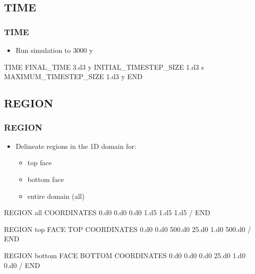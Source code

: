 \documentclass{beamer}
\begin{document}
\subsection{TIME}

\begin{frame}[fragile]\frametitle{TIME}

\begin{itemize}
\item Run simulation to 3000 y
\end{itemize}

\begin{semiverbatim}

TIME
  FINAL_TIME 3.d3 y
  INITIAL_TIMESTEP_SIZE 1.d3 s
  MAXIMUM_TIMESTEP_SIZE 1.d3 y
END

\end{semiverbatim}

\end{frame}

\subsection{REGION}

\begin{frame}\frametitle{REGION}

\begin{itemize}
  \item Delineate regions in the 1D domain for:
  \begin{itemize}
    \item top face
    \item bottom face
    \item entire domain (all)
  \end{itemize}
\end{itemize}

\begin{semiverbatim}
REGION all
  COORDINATES
    0.d0 0.d0 0.d0
    1.d5 1.d5 1.d5
  /
END

\newpage
REGION top
  FACE TOP
  COORDINATES
    0.d0 0.d0  500.d0
    25.d0 1.d0 500.d0
  /
END

REGION bottom
  FACE BOTTOM
  COORDINATES
    0.d0 0.d0  0.d0
    25.d0 1.d0 0.d0
  /
END

\end{semiverbatim}

\end{frame}
\end{document}
